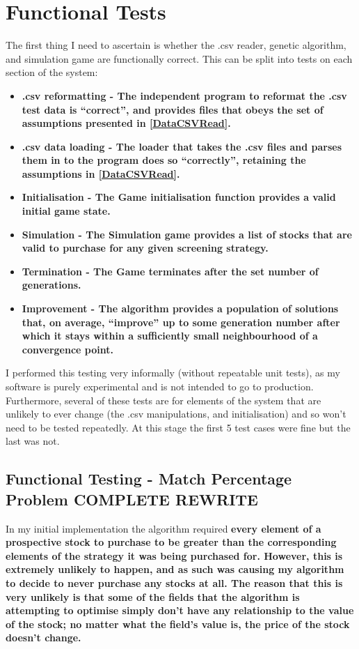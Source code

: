 \section{Functional Tests} \label{functTests}
The first thing I need to ascertain is whether the .csv reader, genetic algorithm, and simulation game are functionally correct. This can be split into tests on each section of the system:
\begin{itemize}
    \item \bf .csv reformatting \rm - The independent program to reformat the .csv test data is ``correct'', and provides files that obeys the set of assumptions presented in \ref{DataCSVRead}.
    \item \bf .csv data loading \rm - The loader that takes the .csv files and parses them in to the program does so ``correctly'', retaining the assumptions in \ref{DataCSVRead}.
    \item \bf Initialisation \rm - The Game initialisation function provides a valid initial game state.
    \item \bf Simulation \rm - The Simulation game provides a list of stocks that are valid to purchase for any given screening strategy.
    \item \bf Termination \rm - The Game terminates after the set number of generations.
    \item \bf Improvement \rm - The algorithm provides a population of solutions that, on average, ``improve'' up to some generation number after which it stays within a sufficiently small neighbourhood of a convergence point.
\end{itemize}

I performed this testing very informally (without repeatable unit tests), as my software is purely experimental and is not intended to go to production. Furthermore, several of these tests are for elements of the system that are unlikely to ever change (the .csv manipulations, and initialisation) and so won't need to be tested repeatedly. At this stage the first 5 test cases were fine but the last was not.

\subsection{Functional Testing - Match Percentage Problem COMPLETE REWRITE} \label{testingConsequences}
In my initial implementation the algorithm required \bf every \rm element of a prospective stock to purchase to be greater than the corresponding elements of the strategy it was being purchased for. However, this is extremely unlikely to happen, and as such was causing my algorithm to decide to never purchase any stocks at all. The reason that this is very unlikely is that some of the fields that the algorithm is attempting to optimise simply don't have any relationship to the value of the stock; no matter what the field's value is, the price of the stock doesn't change. \newline

